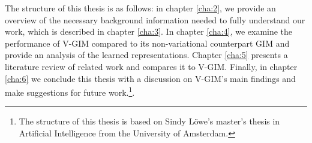 The structure of this thesis is as follows: in chapter \ref{cha:2}, we provide an overview of the necessary background information needed to fully understand our work, which is described in chapter \ref{cha:3}. In chapter \ref{cha:4}, we examine the performance of V-GIM compared to its non-variational counterpart GIM and provide an analysis of the learned representations. Chapter \ref{cha:5} presents a literature review of related work and compares it to V-GIM. Finally, in chapter \ref{cha:6} we conclude this thesis with a discussion on V-GIM's main findings and make suggestions for future work.\footnote{The structure of this thesis is based on Sindy Löwe's master's thesis in Artificial Intelligence from the University of Amsterdam.}. 




%
%



%












